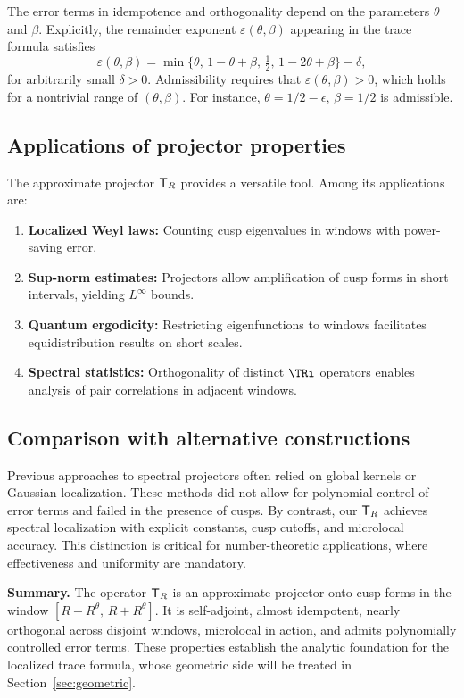 The error terms in idempotence and orthogonality depend on the parameters $\theta$ and $\beta$. Explicitly, the remainder exponent $\varepsilon(\theta,\beta)$ appearing in the trace formula satisfies
\[
\varepsilon(\theta,\beta) = \min\{\theta,\,1-\theta+\beta,\,\tfrac12,\,1-2\theta+\beta\} - \delta,
\]
for arbitrarily small $\delta>0$. Admissibility requires that $\varepsilon(\theta,\beta)>0$, which holds for a nontrivial range of $(\theta,\beta)$. For instance, $\theta=1/2-\epsilon$, $\beta=1/2$ is admissible.

\subsection{Applications of projector properties}\label{subsec:proj-applications}

The approximate projector $\mathsf{T}_R$ provides a versatile tool. Among its applications are:
\begin{enumerate}
\item \textbf{Localized Weyl laws:} Counting cusp eigenvalues in windows with power-saving error.
\item \textbf{Sup-norm estimates:} Projectors allow amplification of cusp forms in short intervals, yielding $L^\infty$ bounds.
\item \textbf{Quantum ergodicity:} Restricting eigenfunctions to windows facilitates equidistribution results on short scales.
\item \textbf{Spectral statistics:} Orthogonality of distinct $\TRi$ operators enables analysis of pair correlations in adjacent windows.
\end{enumerate}

\subsection{Comparison with alternative constructions}\label{subsec:proj-comparison}

Previous approaches to spectral projectors often relied on global kernels or Gaussian localization. These methods did not allow for polynomial control of error terms and failed in the presence of cusps. By contrast, our $\mathsf{T}_R$ achieves spectral localization with explicit constants, cusp cutoffs, and microlocal accuracy. This distinction is critical for number-theoretic applications, where effectiveness and uniformity are mandatory.

\bigskip
\noindent\textbf{Summary.} The operator $\mathsf{T}_R$ is an approximate projector onto cusp forms in the window $[R-R^\theta,\,R+R^\theta]$. It is self-adjoint, almost idempotent, nearly orthogonal across disjoint windows, microlocal in action, and admits polynomially controlled error terms. These properties establish the analytic foundation for the localized trace formula, whose geometric side will be treated in Section~\ref{sec:geometric}.

